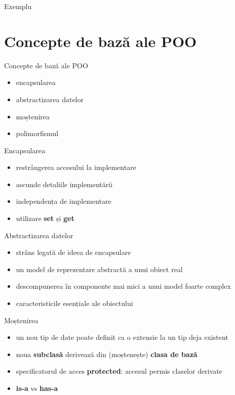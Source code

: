 \documentclass{beamer}
\begin{document}
\begin{frame}{Exemplu}
  \footnotesize{}
\end{frame}

\section{Concepte de bază ale POO}

\begin{frame}{Concepte de bază ale POO}
  \begin{itemize}
  \item encapsularea
  \item abstractizarea datelor
  \item moștenirea
  \item polimorfismul
  \end{itemize}
\end{frame}

\begin{frame}{Encapsularea}    
 \begin{itemize}
  \item restrângerea accesului la implementare
  \item ascunde detaliile implementării
  \item independența de implementare
  \item utilizare \textbf{set} și \textbf{get}
  \end{itemize}  
\end{frame}

\begin{frame}{Abstractizarea datelor}   
  \begin{itemize}
  \item strâns legată de ideea de encapsulare
  \item un model de reprezentare abstractă a unui obiect real
  \item descompunerea în componente mai mici a unui model foarte complex
  \item caracteristicile esențiale ale obiectului
  \end{itemize}  
\end{frame}

\begin{frame}{Moștenirea}
  \begin{itemize}
  \item un nou tip de date poate definit ca o extensie la un tip deja existent
  \item noua \textbf{subclasă} derivează din (moștenește) \textbf{clasa de bază}
  \item specificatorul de acces \textbf{protected}: accesul permis claselor derivate
  \item \textbf{is-a} vs \textbf{has-a}
  \end{itemize}    
\end{frame}
\end{document}
